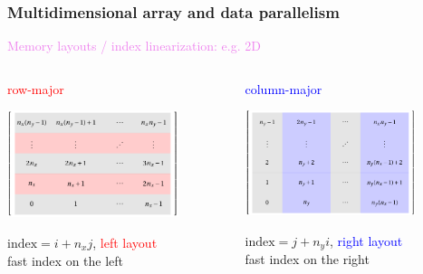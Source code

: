 \begin{frame}
  \frametitle{Multidimensional array and data parallelism}

  \begin{center}
    \textcolor{violet}{\Large Memory layouts / index linearization: e.g. 2D}
  \end{center}
  
  \begin{columns}
    \begin{column}{0.5\textwidth}
      \begin{center}
        \textcolor{red}{\large row-major}
        
        \includegraphics[width=5cm]{images/tikz/row-major}

        $\text{index} = i + n_x j$, \textcolor{red}{left layout}\\
        fast index on the left
      \end{center}
    \end{column}
    \begin{column}{0.5\textwidth}
      \begin{center}
        \textcolor{blue}{\large column-major}
        
        \includegraphics[width=5cm]{images/tikz/col-major}        

        $\text{index} = j + n_y i$, \textcolor{blue}{right layout}\\
        fast index on the right
      \end{center}
    \end{column}
  \end{columns}

\end{frame}

